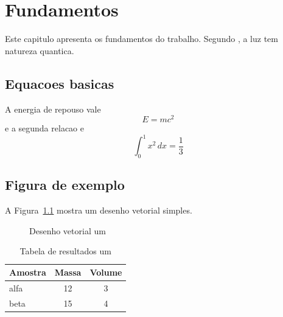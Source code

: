 \chapter{Fundamentos}
Este capitulo apresenta os fundamentos do trabalho. Segundo , a luz tem natureza quantica.
\section{Equacoes basicas}
A energia de repouso vale
\begin{equation}
E = mc^2
\end{equation}
e a segunda relacao e
\begin{equation}
\int_0^1 x^2\,dx = \frac{1}{3}
\end{equation}
\section{Figura de exemplo}
A Figura~\ref{fig:um} mostra um desenho vetorial simples.
\begin{figure}[htb]
\caption{Desenho vetorial um}\label{fig:um}
\end{figure}
\begin{table}[htb]
\caption{Tabela de resultados um}
\begin{tabular}{lcc}\hline
Amostra & Massa & Volume \\ \hline
alfa & 12 & 3 \\
beta & 15 & 4 \\ \hline
\end{tabular}
\end{table}
